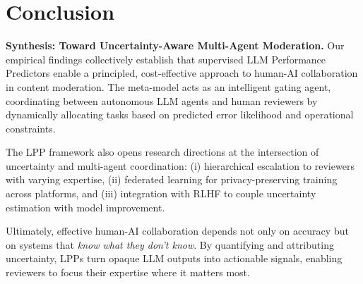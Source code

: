 \section{Conclusion}
\label{sec:conclusion}
\textbf{Synthesis: Toward Uncertainty-Aware Multi-Agent Moderation.}
Our empirical findings collectively establish that supervised LLM Performance Predictors enable a principled, cost-effective approach to human-AI collaboration in content moderation. The meta-model acts as an intelligent gating agent, coordinating between autonomous LLM agents and human reviewers by dynamically allocating tasks based on predicted error likelihood and operational constraints.

The LPP framework also opens research directions at the intersection of uncertainty and multi-agent coordination: (i) hierarchical escalation to reviewers with varying expertise, (ii) federated learning for privacy-preserving training across platforms, and (iii) integration with RLHF to couple uncertainty estimation with model improvement.

Ultimately, effective human-AI collaboration depends not only on accuracy but on systems that \emph{know what they don’t know}. By quantifying and attributing uncertainty, LPPs turn opaque LLM outputs into actionable signals, enabling reviewers to focus their expertise where it matters most.